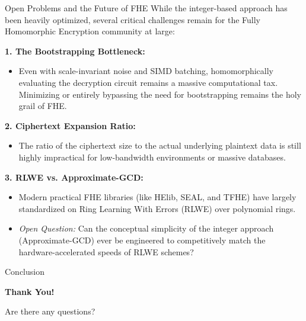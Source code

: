 \documentclass[10pt,handout]{beamer}
\begin{document}
\begin{frame}{Open Problems and the Future of FHE}
    While the integer-based approach has been heavily optimized, several critical challenges remain for the Fully Homomorphic Encryption community at large:
    \pause

    \vspace{0.3cm}
    \textbf{1. The Bootstrapping Bottleneck:}
    \begin{itemize}
        \item Even with scale-invariant noise and SIMD batching, homomorphically evaluating the decryption circuit remains a massive computational tax. Minimizing or entirely bypassing the need for bootstrapping remains the holy grail of FHE.
    \end{itemize}
    \pause

    \vspace{0.2cm}
    \textbf{2. Ciphertext Expansion Ratio:}
    \begin{itemize}
        \item The ratio of the ciphertext size to the actual underlying plaintext data is still highly impractical for low-bandwidth environments or massive databases.
    \end{itemize}
    \pause

    \vspace{0.2cm}
    \textbf{3. RLWE vs. Approximate-GCD:}
    \begin{itemize}
        \item Modern practical FHE libraries (like HElib, SEAL, and TFHE) have largely standardized on Ring Learning With Errors (RLWE) over polynomial rings. 
        \item \textit{Open Question:} Can the conceptual simplicity of the integer approach (Approximate-GCD) ever be engineered to competitively match the hardware-accelerated speeds of RLWE schemes?
    \end{itemize}
\end{frame}

\begin{frame}{Conclusion}
    \begin{center}
        \Large \textbf{Thank You!}
        
        \vspace{0.5cm}
        \normalsize
        Are there any questions?
    \end{center}
\end{frame}
\end{document}
